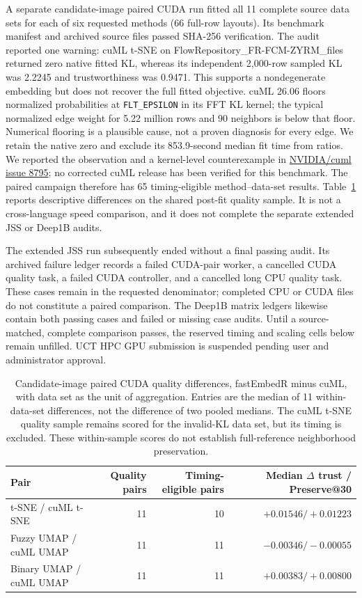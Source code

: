 \documentclass[article]{jss}
\begin{document}
A separate candidate-image paired CUDA run fitted all 11 complete source
data sets for each of six requested methods (66 full-row layouts). Its
benchmark manifest and archived source files passed SHA-256 verification.
The audit reported one warning: cuML t-SNE on
FlowRepository\_FR-FCM-ZYRM\_files returned zero native fitted KL, whereas
its independent 2,000-row sampled KL was 2.2245 and trustworthiness was
0.9471. This supports a nondegenerate embedding but does not recover the
full fitted objective. cuML 26.06 floors normalized probabilities at
\texttt{FLT\_EPSILON} in its FFT KL kernel; the typical normalized
edge weight for 5.22 million rows and 90 neighbors is below that floor.
Numerical flooring is a plausible cause, not a proven diagnosis for every
edge. We retain the native zero and exclude its 853.9-second median fit
time from ratios. We reported the observation and a kernel-level
counterexample in \href{https://github.com/NVIDIA/cuml/issues/8795}{NVIDIA/cuml
issue 8795}; no corrected cuML release has been verified for this benchmark.
The paired campaign therefore has 65 timing-eligible
method--data-set results. Table~\ref{tab:paired-candidate-quality} reports
descriptive differences on the shared post-fit quality sample. It is not
a cross-language speed comparison, and it does not complete the separate
extended JSS or Deep1B audits.

The extended JSS run subsequently ended without a final passing audit.
Its archived failure ledger records a failed CUDA-pair worker, a cancelled
CUDA quality task, a failed CUDA controller, and a cancelled long CPU
quality task. These cases remain in the requested denominator; completed
CPU or CUDA files do not constitute a paired comparison. The Deep1B
matrix ledgers likewise contain both passing cases and failed or missing
case audits. Until a source-matched, complete comparison passes, the
reserved timing and scaling cells below remain unfilled. UCT HPC GPU
submission is suspended pending user and administrator approval.

\begin{table}[htbp]
\centering
\scriptsize
\caption{Candidate-image paired CUDA quality differences, fastEmbedR
  minus cuML, with data set as the unit of aggregation. Entries are the
  median of 11 within-data-set differences, not the difference of two
  pooled medians. The cuML t-SNE quality sample remains scored for the
  invalid-KL data set, but its timing is excluded. These within-sample
  scores do not establish full-reference neighborhood preservation.}
\label{tab:paired-candidate-quality}
\begin{tabular}{lrrr}
\toprule
Pair & Quality pairs & Timing-eligible pairs &
  Median $\Delta$ trust / Preserve@30 \\
\midrule
t-SNE / cuML t-SNE & 11 & 10 & $+0.01546 / +0.01223$ \\
Fuzzy UMAP / cuML UMAP & 11 & 11 & $-0.00346 / -0.00055$ \\
Binary UMAP / cuML UMAP & 11 & 11 & $+0.00383 / +0.00800$ \\
\bottomrule
\end{tabular}
\end{table}
\end{document}
